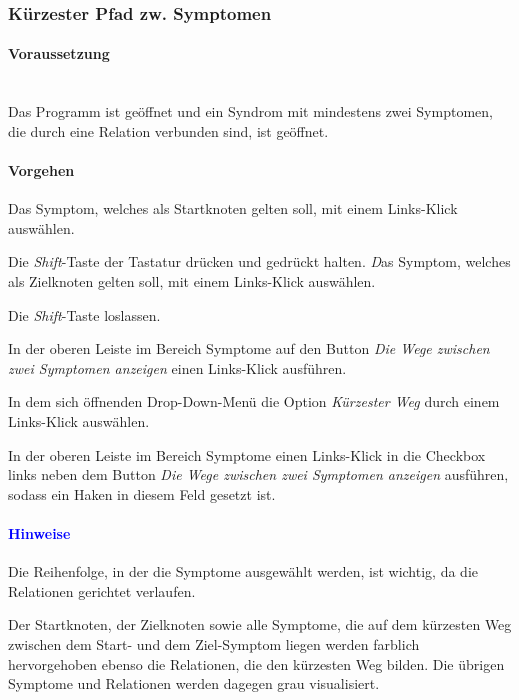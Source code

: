 \documentclass[enabledeprecatedfontcommands,fontsize=11pt,paper=a4,twoside]{scrartcl}
\newcounter{one}
\newcounter{two}[one]
\newcommand*{\hint}{\paragraph{\textcolor{blue}{Hinweise}}}
\newcommand*{\condition}{\paragraph{Voraussetzung}$\;$ \vspace{0.2cm}\\}
\newcommand*{\action}{\paragraph{Vorgehen}}
\let\tempone\itemize
\let\temptwo\enditemize
\renewenvironment{itemize}{\tempone\addtolength{\itemsep}{-10.0pt}}{\temptwo}
\let\origenumerate\enumerate
\let\origendenumerate\endenumerate
\renewenvironment{enumerate}{\origenumerate \addtolength{\itemsep}{-10.0pt}}{\origendenumerate}
\begin{document}
\subsubsection{Kürzester Pfad zw. Symptomen}
	\condition 
		Das Programm ist geöffnet und ein Syndrom mit mindestens zwei Symptomen, die durch eine Relation verbunden sind, ist geöffnet.
	\action
	\begin{enumerate}
		\item Das Symptom, welches als Startknoten gelten soll, mit einem Links-Klick auswählen.
		\item Die \textit{Shift}-Taste der Tastatur drücken und gedrückt halten.
		\textit Das Symptom, welches als Zielknoten gelten soll, mit einem Links-Klick auswählen.
		\item Die \textit{Shift}-Taste loslassen.
		\item In der oberen Leiste im Bereich Symptome auf den Button \textit{Die Wege zwischen zwei Symptomen anzeigen} einen Links-Klick ausführen.
		\item In dem sich öffnenden Drop-Down-Menü die Option \textit{Kürzester Weg} durch einem Links-Klick auswählen.
		\item In der oberen Leiste im Bereich Symptome einen Links-Klick in die Checkbox links neben dem Button \textit{Die Wege zwischen zwei Symptomen anzeigen} ausführen, sodass ein Haken in diesem Feld gesetzt ist.
	\end{enumerate} 
	\hint
	\begin{itemize}
		\item Die Reihenfolge, in der die Symptome ausgewählt werden, ist wichtig, da die Relationen gerichtet verlaufen. 
		\item Der Startknoten, der Zielknoten sowie alle Symptome, die auf dem kürzesten Weg zwischen dem Start- und dem Ziel-Symptom liegen werden farblich hervorgehoben ebenso die Relationen, die den kürzesten Weg bilden. Die übrigen Symptome und Relationen werden dagegen grau visualisiert. \\
	\end{itemize}

\end{document}
